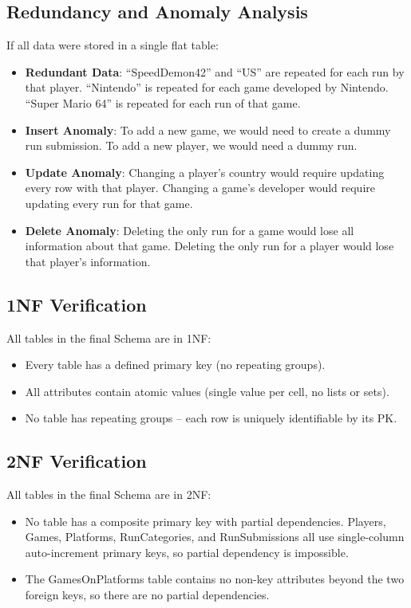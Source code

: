\documentclass[11pt]{article}
\begin{document}
\subsection*{Redundancy and Anomaly Analysis}

If all data were stored in a single flat table:

\begin{itemize}[leftmargin=2em]
    \item \textbf{Redundant Data}: ``SpeedDemon42'' and ``US'' are repeated for each run by that player. ``Nintendo'' is repeated for each game developed by Nintendo. ``Super Mario 64'' is repeated for each run of that game.
    \item \textbf{Insert Anomaly}: To add a new game, we would need to create a dummy run submission. To add a new player, we would need a dummy run.
    \item \textbf{Update Anomaly}: Changing a player's country would require updating every row with that player. Changing a game's developer would require updating every run for that game.
    \item \textbf{Delete Anomaly}: Deleting the only run for a game would lose all information about that game. Deleting the only run for a player would lose that player's information.
\end{itemize}

\subsection*{1NF Verification}

All tables in the final Schema are in 1NF:
\begin{itemize}[leftmargin=2em]
    \item Every table has a defined primary key (no repeating groups).
    \item All attributes contain atomic values (single value per cell, no lists or sets).
    \item No table has repeating groups -- each row is uniquely identifiable by its PK.
\end{itemize}

\subsection*{2NF Verification}

All tables in the final Schema are in 2NF:
\begin{itemize}[leftmargin=2em]
    \item No table has a composite primary key with partial dependencies. Players, Games, Platforms, RunCategories, and RunSubmissions all use single-column auto-increment primary keys, so partial dependency is impossible.
    \item The GamesOnPlatforms table contains no non-key attributes beyond the two foreign keys, so there are no partial dependencies.
\end{itemize}
\end{document}
